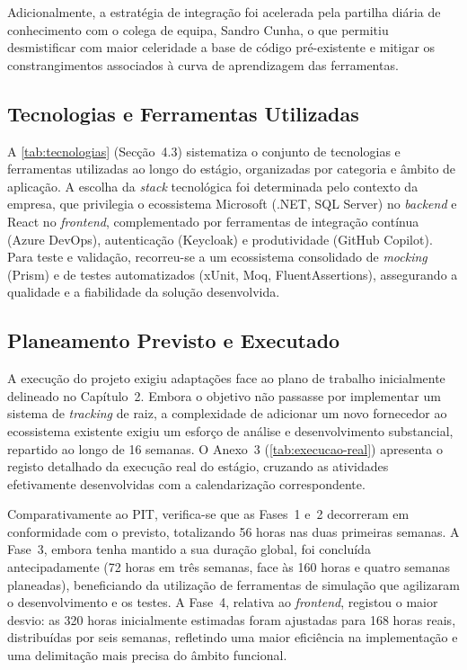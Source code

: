 \documentclass[a4paper,12pt]{report}
\begin{document}
Adicionalmente, a estratégia de integração foi acelerada pela partilha diária de conhecimento com o colega de equipa, Sandro Cunha, o que permitiu desmistificar com maior celeridade a base de código pré-existente e mitigar os constrangimentos associados à curva de aprendizagem das ferramentas.

\subsection{Tecnologias e Ferramentas Utilizadas}

A \autoref{tab:tecnologias} (Secção~4.3) sistematiza o conjunto de tecnologias e ferramentas utilizadas ao longo do estágio, organizadas por categoria e âmbito de aplicação. A escolha da \textit{stack} tecnológica foi determinada pelo contexto da empresa, que privilegia o ecossistema Microsoft (.NET, SQL Server) no \textit{backend} e React no \textit{frontend}, complementado por ferramentas de integração contínua (Azure DevOps), autenticação (Keycloak) e produtividade (GitHub Copilot). Para teste e validação, recorreu-se a um ecossistema consolidado de \textit{mocking} (Prism) e de testes automatizados (xUnit, Moq, FluentAssertions), assegurando a qualidade e a fiabilidade da solução desenvolvida.

\subsection{Planeamento Previsto e Executado}

A execução do projeto exigiu adaptações face ao plano de trabalho inicialmente delineado no Capítulo~2. Embora o objetivo não passasse por implementar um sistema de \textit{tracking} de raiz, a complexidade de adicionar um novo fornecedor ao ecossistema existente exigiu um esforço de análise e desenvolvimento substancial, repartido ao longo de 16 semanas. O Anexo~3 (\autoref{tab:execucao-real}) apresenta o registo detalhado da execução real do estágio, cruzando as atividades efetivamente desenvolvidas com a calendarização correspondente.

Comparativamente ao PIT, verifica-se que as Fases~1 e~2 decorreram em conformidade com o previsto, totalizando 56 horas nas duas primeiras semanas. A Fase~3, embora tenha mantido a sua duração global, foi concluída antecipadamente (72 horas em três semanas, face às 160 horas e quatro semanas planeadas), beneficiando da utilização de ferramentas de simulação que agilizaram o desenvolvimento e os testes. A Fase~4, relativa ao \textit{frontend}, registou o maior desvio: as 320 horas inicialmente estimadas foram ajustadas para 168 horas reais, distribuídas por seis semanas, refletindo uma maior eficiência na implementação e uma delimitação mais precisa do âmbito funcional.
\end{document}
